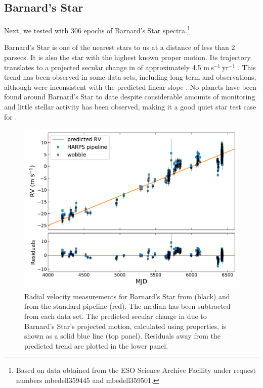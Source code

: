 \documentclass[modern]{aastex62}
\newcommand{\Mdwarf}{Barnard's Star\xspace} %
\begin{document}
\subsection{\Mdwarf}
\label{s:Mdwarf}

Next, we tested \wobble with 306 epochs of \Mdwarf spectra.\footnote{Based on data obtained from the ESO Science Archive Facility under request numbers mbedell359445 and mbedell359501.} 

\Mdwarf is one of the nearest stars to us at a distance of less than 2 parsecs. 
It is also the star with the highest known proper motion. 
Its trajectory translates to a projected secular change in \RV of approximately 4.5 $\mathrm{m}~\mathrm{s}^{-1}~\mathrm{yr}^{-1}$ \citep{Kurster2003}. 
This trend has been observed in some data sets, including long-term \HARPS and  observations, although  \RVs were inconsistent with the predicted linear slope \citep{Kurster2003, Bonfils2013, Choi2013, Montet2014}. 
No planets have been found around \Mdwarf to date despite considerable amounts of \RV monitoring and little stellar activity has been observed, making it a good quiet star test case for \wobble. 

\begin{figure}
\centering
\includegraphics[width=5in]{barnards_rvs}
\caption{Radial velocity measurements for \Mdwarf from \wobble (black) and from the standard \HARPS pipeline (red). The median \RV has been subtracted from each data set. The predicted secular change in \RV due to \Mdwarf's projected motion, calculated using \gaia properties, is shown as a solid blue line (top panel). Residuals away from the predicted trend are plotted in the lower panel.}
\label{fig:barnards_rvs}
\end{figure}
\end{document}
